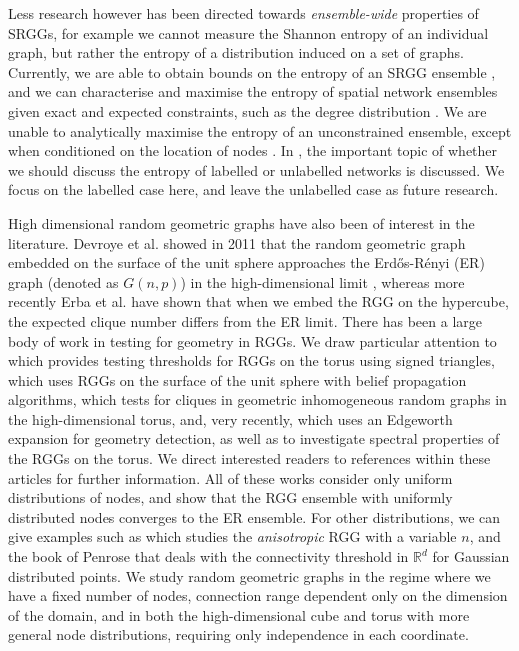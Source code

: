 \documentclass{article}
\begin{document}
\noindent Less research however has been directed towards \textit{ensemble-wide} properties of SRGGs, for example we cannot measure the Shannon entropy of an individual graph, but rather the entropy of a distribution induced on a set of graphs. Currently, we are able to obtain bounds on the entropy of an SRGG ensemble \cite{coon2018entropy, badiu2018distribution}, and we can characterise and maximise the entropy of spatial network ensembles given exact and expected constraints, such as the degree distribution \cite{bianconi2021information}. We are unable to analytically maximise the entropy of an unconstrained ensemble, except when conditioned on the location of nodes \cite{coon2018entropy}. In \cite{paton2022entropy}, the important topic of whether we should discuss the entropy of labelled or unlabelled networks is discussed. We focus on the labelled case here, and leave the unlabelled case as future research. \newline

\noindent  High dimensional random geometric graphs have also been of interest in the literature. Devroye et al. showed in 2011 that the random geometric graph embedded on the surface of the unit sphere approaches the Erd\H os-R\'enyi (ER) graph (denoted as $G(n,p)$) in the high-dimensional limit \cite{devroye2011high}, whereas more recently Erba et al. \cite{erba2020random} have shown that when we embed the RGG on the hypercube, the expected clique number differs from the ER limit. There has been a large body of work in testing for geometry in RGGs. We draw particular attention to \cite{bangachev2023detection} which provides testing thresholds for RGGs on the torus using signed triangles, \cite{liu2022testing} which uses RGGs on the surface of the unit sphere with belief propagation algorithms, \cite{friedrich2023cliques} which tests for cliques in geometric inhomogeneous random graphs in the high-dimensional torus, and, very recently, \cite{baguley2025testing} which uses an Edgeworth expansion for geometry detection, as well as to investigate spectral properties of the RGGs on the torus. We direct interested readers to references within these articles for further information. All of these works consider only uniform distributions of nodes, and show that the RGG ensemble with uniformly distributed nodes converges to the ER ensemble. For other distributions, we can give examples such as \cite{brennan2024threshold} which studies the \textit{anisotropic} RGG with a variable $n$, and the book of Penrose \cite{penrose2003random} that deals with the connectivity threshold in  $\mathbb{R}^d$  for Gaussian distributed points. We study random geometric graphs in the regime where we have a fixed number of nodes, connection range dependent only on the dimension of the domain, and in both the high-dimensional cube and torus with more general node distributions, requiring only independence in each coordinate.
\end{document}
